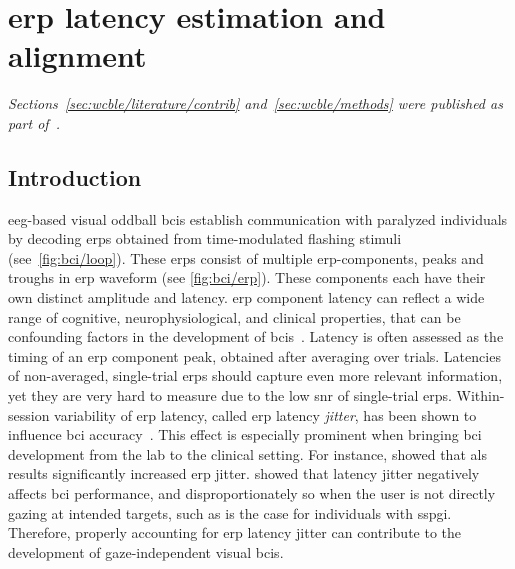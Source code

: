 
\chapter{\Acs{erp} latency estimation and alignment}
\label{sec:wcble}
\emph{Sections~\ref{sec:wcble/literature/contrib} and~\ref{sec:wcble/methods} were published
as part of~\textcite{VanDenKerchove2024}.}

\section{Introduction}
\label{sec:wcble/intro}

\Ac{eeg}-based visual oddball \acp{bci} establish communication with paralyzed
individuals by decoding \acp{erp} obtained from time-modulated flashing
stimuli (see~\cref{fig:bci/loop}).
These \acp{erp} consist of multiple \ac{erp}-components, peaks and troughs in
\ac{erp} waveform (see \cref{fig:bci/erp}).
These components each have their own distinct amplitude and latency.
\Ac{erp} component latency can reflect a wide range of cognitive,
neurophysiological, and clinical properties, that can be confounding factors in
the development of \acp{bci}~\cite{Luck2014}.
Latency is often assessed as the timing of an \ac{erp} component peak, obtained
after averaging over trials.
Latencies of non-averaged, single-trial \acp{erp} should capture even more
relevant information, yet they are very hard to measure due to the low \ac{snr} of
single-trial \acp{erp}.
Within-session variability of \ac{erp} latency, called \ac{erp} latency
\emph{jitter}, has been shown to influence \ac{bci}
accuracy~\cite{Thompson2012}.
This effect is especially prominent when bringing \ac{bci} development from the
lab to the clinical setting.
For instance, \textcite{Zisk2021} showed that \ac{als} results significantly
increased \ac{erp} jitter.
\textcite{Arico2014} showed that latency jitter negatively affects \ac{bci}
performance, and disproportionately so when the user is not directly gazing at
intended targets, such as is the case for individuals with \ac{sspgi}.
Therefore, properly accounting for \ac{erp} latency jitter can contribute to
the development of gaze-independent visual \acp{bci}.


